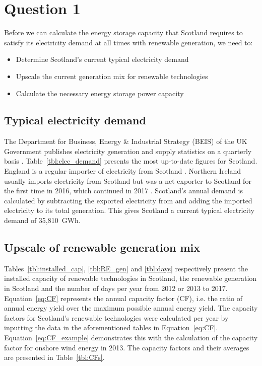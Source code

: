 \section{Question 1}



Before we can calculate the energy storage capacity that Scotland requires to satisfy its electricity demand at all times with renewable generation, we need to:
\begin{itemize}
	\item Determine Scotland's current typical electricity demand
	\item Upscale the current generation mix for renewable technologies
	\item Calculate the necessary energy storage power capacity
\end{itemize}




\subsection{Typical electricity demand}

The Department for Business, Energy {\&} Industrial Strategy (BEIS) of the UK Government publishes electricity generation and supply statistics on a quarterly basis \citep{BEIS2018ElecUK}.
Table~\ref{tbl:elec_demand} presents the most up-to-date figures for Scotland.
England is a regular importer of electricity from Scotland \citep{BEIS2018EnergyTrends}.
Northern Ireland usually imports electricity from Scotland but was a net exporter to Scotland for the first time in 2016, which continued in 2017 \citep{BEIS2018EnergyTrends}.
Scotland's annual demand is calculated by subtracting the exported electricity from and adding the imported electricity to its total generation.
This gives Scotland a current typical electricity demand of 35,810~GWh.






\subsection{Upscale of renewable generation mix}

Tables~\ref{tbl:installed_cap}, \ref{tbl:RE_gen} and \ref{tbl:days} respectively present the installed capacity of renewable technologies in Scotland, the renewable generation in Scotland and the number of days per year from 2012 or 2013 to 2017.
Equation~\ref{eq:CF} represents the annual capacity factor (CF), i.e. the ratio of annual energy yield over the maximum possible annual energy yield.
The capacity factors for Scotland's renewable technologies were calculated per year by inputting the data in the aforementioned tables in Equation~\ref{eq:CF}.
Equation~\ref{eq:CF_example} demonstrates this with the calculation of the capacity factor for onshore wind energy in 2013.
The capacity factors and their averages are presented in Table~\ref{tbl:CFs}.

